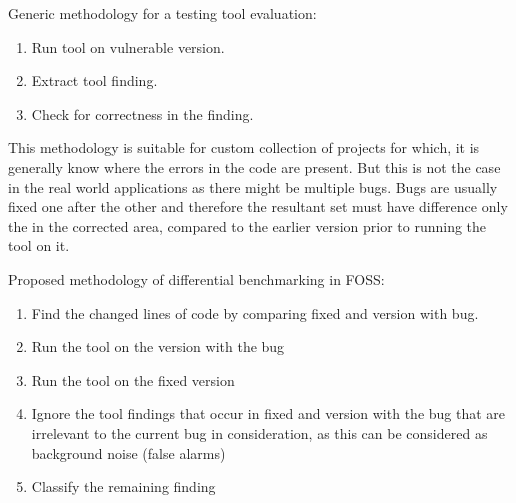 \documentclass[authoryear,preprint]{sigplanconf}
\begin{document}
Generic methodology for a testing tool evaluation: 
\begin{enumerate}
	\item Run tool on vulnerable version.
	\item Extract tool finding.
	\item Check for correctness in the finding.
\end{enumerate}

This methodology is suitable for custom collection of projects for which, it is generally know where the errors in the code are present. But this is not the case in the real world applications as there might be multiple bugs. Bugs are usually fixed one after the other and therefore the resultant set must have difference only the in the corrected area, compared to the earlier version prior to running the tool on it. 

Proposed methodology of differential benchmarking in FOSS:
\begin{enumerate}
	\item Find the changed lines of code by comparing fixed and version with bug.
	\item Run the tool on the version with the bug
	\item Run the tool on the fixed version
	\item Ignore the tool findings that occur in fixed and version with the bug that are irrelevant to the current bug in consideration, as this can be considered as background noise (false alarms)
	\item Classify the remaining finding
\end{enumerate}
\end{document}
